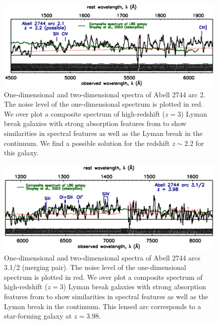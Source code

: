 \begin{figure}[h]
\includegraphics[width=\textwidth]{Chap2/c2f16.eps}
\caption[Abell 2744, arc 2.1 spectrum]{One-dimensional and two-dimensional spectra of Abell 2744 arc 2. The noise level of the one-dimensional spectrum is plotted in red. We over plot a composite spectrum of high-redshift ($z=3$) Lyman break galaxies with strong absorption features from \citet{Shapley:2003fk} to show similarities in spectral features as well as the Lyman break in the continuum. We find a possible solution for the redshift $z\sim2.2$ for this galaxy.}
\label{app:fig:a2744_spec2}
\end{figure}

\begin{figure}[h]
\includegraphics[width=\textwidth]{Chap2/c2f17.eps}
\caption[Abell 2744, arc 3.1/2 spectrum]{One-dimensional and two-dimensional spectra of Abell 2744 arcs 3.1/2 (merging pair). The noise level of the one-dimensional spectrum is plotted in red. We over plot a composite spectrum of high-redshift ($z=3$) Lyman break galaxies with strong absorption features from \citet{Shapley:2003fk} to show similarities in spectral features as well as the Lyman break in the continuum. This lensed arc corresponds to a star-forming galaxy at $z=3.98$.}
\label{app:fig:a2744_spec3}
\end{figure}

